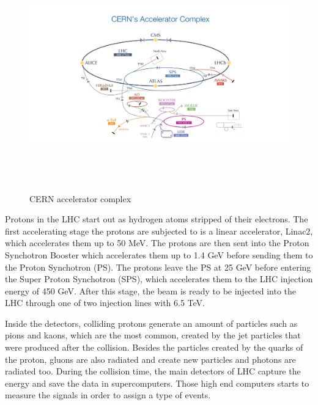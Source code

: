 \begin{figure}[ht]
\centering
\includegraphics[width=16cm,height=10cm]{Chapter1/cern.jpg}
\caption[Large hadron collider from CERN]{CERN accelerator complex \cite{cern1}} \label{lhc}
\end{figure}


Protons in the LHC start out as hydrogen atoms stripped of their electrons. The first accelerating stage the protons are subjected to is a linear accelerator, Linac2,
which accelerates them up to 50 MeV. The protons are then sent into the
Proton Synchotron Booster which accelerates them up to 1.4 GeV before sending them to the Proton Synchotron (PS). The protons leave the PS at 25 GeV before entering the Super Proton Synchotron (SPS), which accelerates them to the LHC injection energy of 450 GeV. After this stage, the beam is ready to be injected into
the LHC through one of two injection lines with 6.5 TeV\cite{cern3}.

\pagebreak
Inside the detectors, colliding protons generate an amount of particles such as pions and kaons, which are the most common, created by the jet particles that were produced after the collision. Besides the particles created by the quarks of the proton, gluons are also radiated and create new particles and photons are radiated too. 
During the collision time, the main detectors of LHC capture the energy 
and save the data in supercomputers. Those high end computers starts to measure the signals in order to assign a type of events.


